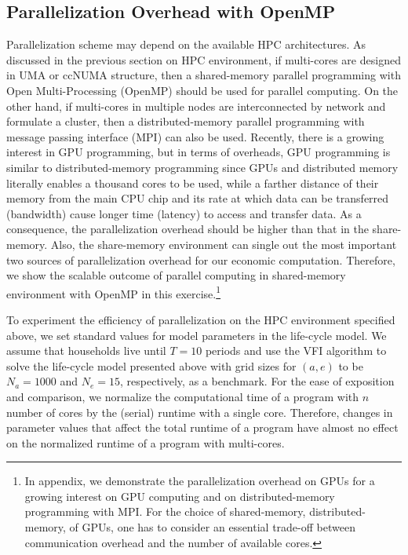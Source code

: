 \documentclass[12pt]{article}
\begin{document}
\subsection{Parallelization Overhead with OpenMP}
Parallelization scheme may depend on the available HPC architectures. As discussed in the previous section on HPC environment, if multi-cores are designed in UMA or ccNUMA structure, then a shared-memory parallel programming with Open Multi-Processing (OpenMP) should be used for parallel computing. On the other hand, if multi-cores in multiple nodes are interconnected by network and formulate a cluster, then a distributed-memory parallel programming with message passing interface (MPI) can also be used. Recently, there is a growing interest in GPU programming, but in terms of overheads, GPU programming is similar to distributed-memory programming since GPUs and distributed memory literally enables a thousand cores to be used, while a farther distance of their memory from the main CPU chip and its rate at which data can be transferred (bandwidth) cause longer time (latency) to access and transfer data. As a consequence, the parallelization overhead should be higher than that in the share-memory. Also, the share-memory environment can single out the most important two sources of parallelization overhead for our economic computation. Therefore, we show the scalable outcome of parallel computing in shared-memory environment with OpenMP in this exercise.\footnote{\sf In appendix, we demonstrate the parallelization overhead on GPUs for a growing interest on GPU computing and on distributed-memory programming with MPI. For the choice of shared-memory, distributed-memory, of GPUs, one has to consider an essential trade-off between communication overhead and the number of available cores.}

To experiment the efficiency of parallelization on the HPC environment specified above, we set standard values for model parameters in the life-cycle model. We assume that households live until $T=10$ periods and use the VFI algorithm to solve the life-cycle model presented above with grid sizes for $(a,e)$ to be $N_a = 1000$ and $N_e=15$, respectively, as a benchmark. For the ease of exposition and comparison, we normalize the computational time of a program with $n$ number of cores by the (serial) runtime with a single core. Therefore, changes in parameter values that affect the total runtime of a program have almost no effect on the normalized runtime of a program with multi-cores.
\end{document}
